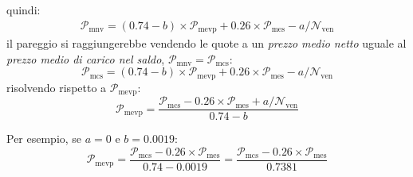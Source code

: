 \documentclass[12pt,a4paper]{article}
\newcommand{\Nven}[1]{\mathcal{N}_{\textrm{ven}#1}}
\newcommand{\Pme}[1]{\mathcal{P}_{\mathrm{me}#1}}
\newcommand{\Pmes}[1]{\Pme{\mathrm{s}#1}}
\newcommand{\Pmc}[1]{\mathcal{P}_{\mathrm{mc}#1}}
\newcommand{\Pmcs}[1]{\Pmc{\mathrm{s}#1}}
\newcommand{\Pmnv}[1]{\mathcal{P}_{\mathrm{mnv}#1}}
\newcommand{\Pmevp}[1]{\mathcal{P}_{\mathrm{mevp}#1}}
\begin{document}
quindi:
\begin{align*}
  \Pmnv{}
  = \left( \num{0,74} - b \right) \times{} \Pmevp{}
  + \num{0,26} \times{} \Pmes{}
  - a / \Nven{}
\end{align*}
il  pareggio  si  raggiungerebbe  vendendo  le  quote a  un  \emph{prezzo  medio  netto}  uguale  al
\emph{prezzo medio di carico nel saldo}, \(\Pmnv{} = \Pmcs{}\):
\begin{equation*}
  \Pmcs{}
  = \left( \num{0,74} - b \right) \times{} \Pmevp{}
  + \num{0,26} \times{} \Pmes{}
  - a / \Nven{}
\end{equation*}
risolvendo rispetto a \(\Pmevp{}\):
\begin{equation*}
  \Pmevp{}
  = \frac{\Pmcs{} - \num{0,26} \times{} \Pmes{} + a / \Nven{}}
  {\num{0,74} - b}
\end{equation*}

Per esempio, se \(a = 0\) e \(b = \num{0,0019}\):
\begin{equation*}
  \Pmevp{}
  = \frac{\Pmcs{} - \num{0,26} \times{} \Pmes{}}{\num{0,74} - \num{0,0019}}
  = \frac{\Pmcs{} - \num{0,26} \times{} \Pmes{}}{\num{0,7381}}
\end{equation*}




\end{document}
